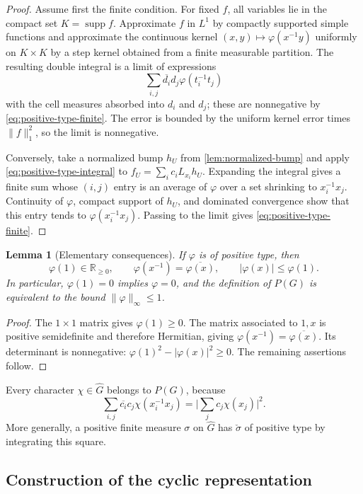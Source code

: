 \documentclass[11pt]{article}
\newtheorem{lemma}[theorem]{Lemma}
\theoremstyle{definition}
\theoremstyle{remark}
\newcommand{\R}{\mathbb R}
\newcommand{\supp}{\operatorname{supp}}
\newcommand{\Lp}[1]{L^{#1}}
\newcommand{\dual}[1]{\widehat{#1}}
\newcommand{\abs}[1]{\lvert #1\rvert}
\newcommand{\norm}[1]{\lVert #1\rVert}
\begin{document}
\begin{proof}
Assume first the finite condition.  For fixed $f$, all variables lie in the compact set
$K=\supp f$.  Approximate $f$ in $\Lp1$ by compactly supported simple functions and
approximate the continuous kernel $(x,y)\mapsto\varphi(x^{-1}y)$ uniformly on
$K\times K$ by a step kernel obtained from a finite measurable partition.  The resulting
double integral is a limit of expressions
\[
  \sum_{i,j}\overline{d_i}d_j\varphi(t_i^{-1}t_j)
\]
with the cell measures absorbed into $d_i$ and $d_j$; these are nonnegative by
\eqref{eq:positive-type-finite}.  The error is bounded by the uniform kernel error times
$\norm f_1^2$, so the limit is nonnegative.

Conversely, take a normalized bump $h_U$ from \cref{lem:normalized-bump} and apply
\eqref{eq:positive-type-integral} to
$f_U=\sum_i c_iL_{x_i}h_U$.  Expanding the integral gives a finite sum whose $(i,j)$
entry is an average of $\varphi$ over a set shrinking to $x_i^{-1}x_j$.  Continuity of
$\varphi$, compact support of $h_U$, and dominated convergence show that this entry
tends to $\varphi(x_i^{-1}x_j)$.  Passing to the limit gives
\eqref{eq:positive-type-finite}.
\end{proof}

\begin{lemma}[Elementary consequences]
\label{lem:positive-type-elementary}
If $\varphi$ is of positive type, then
\[
 \varphi(1)\in\R_{\geq0},\qquad
 \varphi(x^{-1})=\overline{\varphi(x)},\qquad
 \abs{\varphi(x)}\leq\varphi(1).
\]
In particular, $\varphi(1)=0$ implies $\varphi=0$, and the definition of $P(G)$ is
equivalent to the bound $\norm\varphi_\infty\leq1$.
\end{lemma}

\begin{proof}
The $1\times1$ matrix gives $\varphi(1)\geq0$.  The matrix associated to $1,x$ is
positive semidefinite and therefore Hermitian, giving
$\varphi(x^{-1})=\overline{\varphi(x)}$.  Its determinant is nonnegative:
$\varphi(1)^2-\abs{\varphi(x)}^2\geq0$.  The remaining assertions follow.
\end{proof}

Every character $\chi\in\dual G$ belongs to $P(G)$, because
\[
 \sum_{i,j}\overline{c_i}c_j\chi(x_i^{-1}x_j)
 =\abs{\sum_jc_j\chi(x_j)}^2.
\]
More generally, a positive finite measure $\sigma$ on $\dual G$ has
$\check\sigma$ of positive type by integrating this square.

\subsection{Construction of the cyclic representation}
\end{document}
